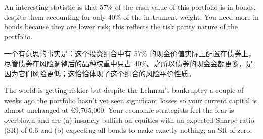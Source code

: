 \begin{chinesetableblock} 
\end{chinesetableblock}

\begin{englishblock} An interesting statistic is that 57\% of the cash value of this portfolio is in bonds, despite them accounting for only 40\% of the instrument weight. You need more in bonds because they are lower risk; this reflects the risk parity nature of the portfolio. \end{englishblock}

\begin{chineseblock}一个有意思的事实是：这个投资组合中有 57\% 的现金价值实际上配置在债券上，尽管债券在风险调整后的品种权重中只占 40\%。之所以债券的现金金额更多，是因为它们风险更低；这恰恰体现了这个组合的风险平价性质。\end{chineseblock}


\begin{englishblock} The world is getting riskier but despite the Lehman's bankruptcy a couple of weeks ago the portfolio hasn't yet seen significant losses so your current capital is almost unchanged at €9,705,000. Your economic strategists feel the fear is overblown and are (a) insanely bullish on equities with an expected Sharpe ratio (SR) of 0.6 and (b) expecting all bonds to make exactly nothing; an SR of zero. \end{englishblock}

